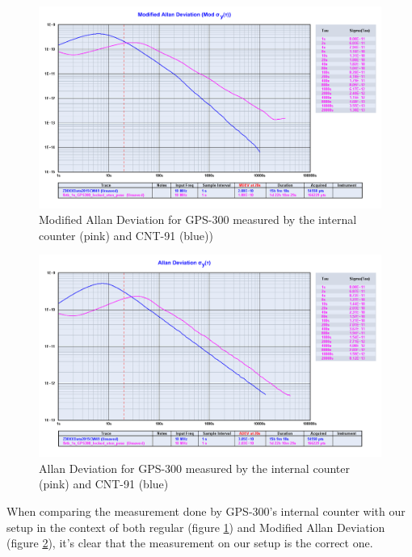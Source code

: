 \documentclass[11pt,english,a4paper]{article}
\begin{document}
\begin{figure}[!htb]
  \centering
    \includegraphics[width=1\textwidth]{part1_spm4_modified_allan.png}
      \caption{Modified Allan Deviation for GPS-300 measured by the internal counter (pink) and CNT-91 (blue))}
          \label{fig:part1_spm4_modified_allan}
\end{figure}

\begin{figure}[!htb]
  \centering
    \includegraphics[width=1\textwidth]{part1_spm4_allan.png}
      \caption{Allan Deviation for GPS-300 measured by the internal counter (pink) and CNT-91 (blue)}
          \label{fig:part1_spm4_allan}
\end{figure}

When comparing the measurement done by GPS-300's internal counter with our setup in the context of both regular (figure \ref{fig:part1_spm4_modified_allan}) and Modified Allan Deviation (figure \ref{fig:part1_spm4_allan}), it's clear that the measurement on our setup is the correct one. 
\end{document}
